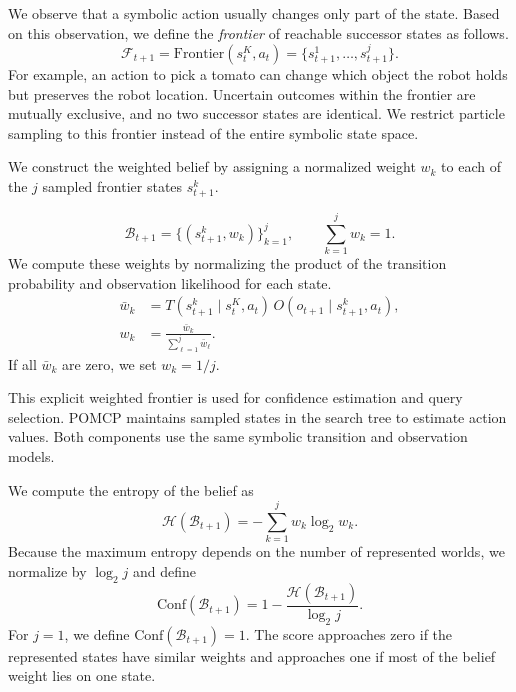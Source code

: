 We observe that a symbolic action usually changes only part of the state. Based on this observation, we define the \textit{frontier} of reachable successor states as follows.
\begin{equation}
\mathcal{F}_{t+1}
=
\mathrm{Frontier}(s_t^{K},a_t)
=
\{s_{t+1}^{1},\ldots,s_{t+1}^{j}\}.
\label{eq:frontier}
\end{equation}
For example, an action to pick a tomato can change which object the robot holds but preserves the robot location. Uncertain outcomes within the frontier are mutually exclusive, and no two successor states are identical. We restrict particle sampling to this frontier instead of the entire symbolic state space.

We construct the weighted belief by assigning a normalized weight $w_k$ to each of the $j$ sampled frontier states $s_{t+1}^{k}$.

\begin{equation}
\mathcal{B}_{t+1}
=
\{(s_{t+1}^{k},w_k)\}_{k=1}^{j},
\qquad
\sum_{k=1}^{j}w_k=1.
\label{eq:symbolic_belief}
\end{equation}
We compute these weights by normalizing the product of the transition probability and observation likelihood for each state.
\begin{equation}
\begin{aligned}
\bar{w}_{k}
&=T(s_{t+1}^{k}\mid s_t^{K},a_t)\,
O(o_{t+1}\mid s_{t+1}^{k},a_t),\\
w_k&=\frac{\bar{w}_k}{\sum_{\ell=1}^{j}\bar{w}_{\ell}}.
\end{aligned}
\label{eq:belief_update}
\end{equation}
If all $\bar{w}_k$ are zero, we set $w_k=1/j$.

This explicit weighted frontier is used for confidence estimation and query selection. POMCP maintains sampled states in the search tree to estimate action values. Both components use the same symbolic transition and observation models.

We compute the entropy of the belief as
\[
\mathcal{H}(\mathcal{B}_{t+1})
=
-\sum_{k=1}^{j}w_k\log_2 w_k.
\]
Because the maximum entropy depends on the number of represented worlds, we normalize by $\log_2 j$ and define
\begin{equation}
\mathrm{Conf}(\mathcal{B}_{t+1})
=
1-\frac{\mathcal{H}(\mathcal{B}_{t+1})}{\log_2 j}.
\label{eq:compute_confidence}
\end{equation}
For $j=1$, we define $\mathrm{Conf}(\mathcal{B}_{t+1})=1$. The score approaches zero if the represented states have similar weights and approaches one if most of the belief weight lies on one state.

